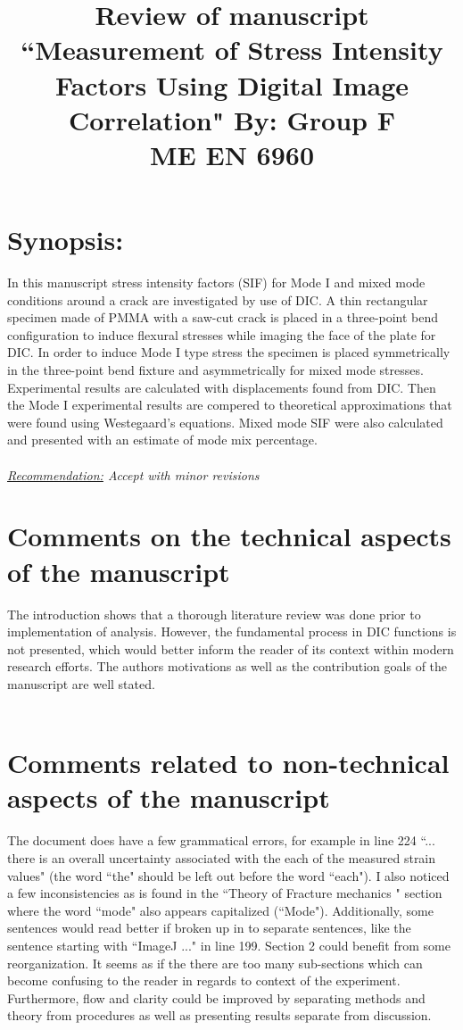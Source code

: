 \documentclass[12pt]{article}
\begin{document}
\title{ Review of manuscript ``Measurement of Stress Intensity Factors Using Digital Image Correlation" By: Group F\\ \normalsize{ME EN 6960}}
\maketitle


\section*{Synopsis:} 
In this manuscript stress intensity factors (SIF) for Mode I and mixed mode conditions around a crack are investigated by use of DIC. A  thin rectangular specimen made of PMMA with a saw-cut crack is placed in a three-point bend configuration to induce flexural stresses while imaging the face of the plate for DIC. In order to induce Mode I type stress the specimen is placed symmetrically in the three-point bend fixture and asymmetrically for mixed mode stresses.  Experimental results are calculated with displacements found from DIC. Then the Mode I experimental results are compered to theoretical approximations that were found using Westegaard's equations. Mixed mode SIF were  also calculated and presented with an estimate of mode mix percentage.
\\ 
\\
\textit{\underline{Recommendation:} Accept with minor revisions}

\section*{Comments on the technical aspects of the manuscript}
The introduction shows that a thorough literature review was done prior to implementation of analysis. However, the fundamental process in  DIC functions is not presented, which would better inform the reader of its context within modern research efforts.   The authors motivations as well as the contribution goals of the manuscript are well stated. 
 \\
 \\

\section*{Comments related to non-technical aspects of the manuscript} 

The document does have a few grammatical errors, for example in line 224 ``... there is an overall uncertainty associated with the each of the measured strain values" (the word ``the" should be left out before the word ``each").  I also noticed a few inconsistencies as is found in the ``Theory of Fracture mechanics " section where the word ``mode" also appears capitalized (``Mode"). Additionally, some sentences would read better if broken up in to separate sentences, like the sentence starting with ``ImageJ ..." in line 199. 
Section 2 could benefit from some reorganization. It seems as if the there are too many sub-sections which can become confusing to the reader in regards to context of the experiment.  Furthermore, flow and clarity could be improved by separating methods and theory from procedures as well as presenting results separate from discussion.
\end{document}
